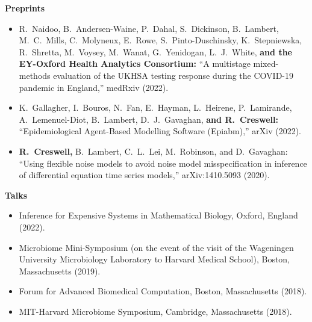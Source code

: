 \documentclass[11pt]{article}
\begin{document}
\vspace*{.4cm}
\noindent\textbf{Preprints}
\vspace*{.5cm}
\begin{itemize}[leftmargin=*]
\setlength{\itemsep}{4pt}
\setlength{\parskip}{0pt}
\setlength{\parsep}{0pt}
\vspace{-.5cm}


\item {\color{gray}R.\ Naidoo, B.\ Andersen-Waine, P.\ Dahal, S.\ Dickinson, B.\ Lambert, M.\ C.\ Mills,  C.\ Molyneux, E.\ Rowe, S.\ Pinto-Duschinsky, K.\ Stepniewska, R.\ Shretta, M.\ Voysey, M.\ Wanat, G.\ Yenidogan, L.\ J.\ White,} \textbf{and the EY-Oxford Health Analytics Consortium:} ``A multistage mixed-methods evaluation of the UKHSA testing response during the COVID-19 pandemic in England,'' medRxiv (2022).


\item {\color{gray}K.\ Gallagher,\textsuperscript{\dag} I.\ Bouros,\textsuperscript{\dag} N.\ Fan,\textsuperscript{\dag} E.\ Hayman,\textsuperscript{\dag} L.\ Heirene,\textsuperscript{\dag} P.\ Lamirande,\textsuperscript{\dag} A.\ Lemenuel-Diot, B.\ Lambert, D.\ J.\ Gavaghan,} \textbf{and R.\ Creswell:} ``Epidemiological Agent-Based Modelling Software (Epiabm),'' arXiv (2022).


\item \textbf{R.\ Creswell,} {\color{gray} B.\ Lambert, C.\ L.\ Lei, M.\ Robinson, and D.\ Gavaghan:} ``Using flexible noise models to avoid noise model misspecification in inference of differential equation time series models,'' arXiv:1410.5093 (2020).
\end{itemize}

\vspace*{.4cm}

\noindent\textbf{Talks}
\vspace*{.5cm}
\begin{itemize}[leftmargin=*]
\setlength{\itemsep}{4pt}
\setlength{\parskip}{0pt}
\setlength{\parsep}{0pt}
\vspace{-.5cm}
\item Inference for Expensive Systems in Mathematical Biology, Oxford, England (2022).
\item Microbiome Mini-Symposium (on the event of the visit of the Wageningen University Microbiology Laboratory to Harvard Medical School), Boston, Massachusetts (2019).
\item Forum for Advanced Biomedical Computation, Boston, Massachusetts (2018).
\item MIT-Harvard Microbiome Symposium, Cambridge, Massachusetts (2018).
\end{itemize}
\end{document}
